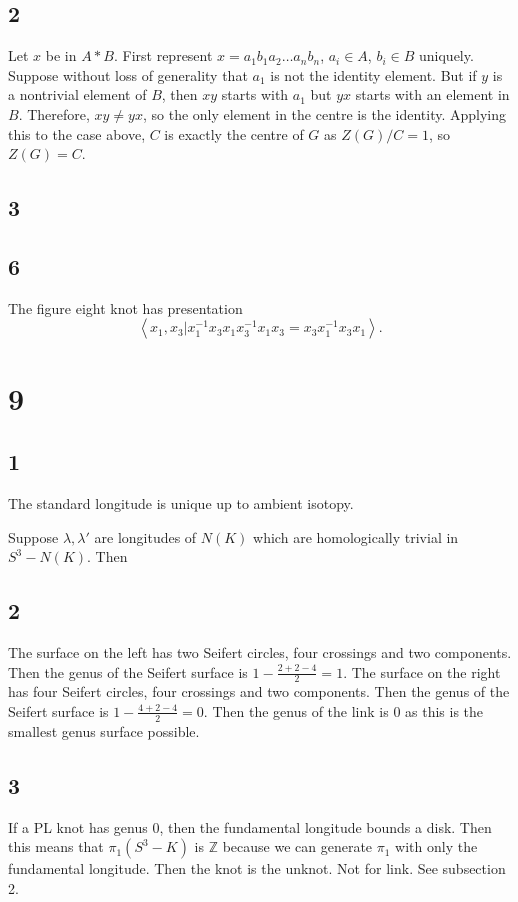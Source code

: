 \documentclass{article}
\theoremstyle{definition}
\numberwithin{theorem}{section}
\numberwithin{equation}{section}
\begin{document}
\subsection{2}
Let $x$ be in $A * B$. First represent $x = a_1 b_1 a_2 \ldots a_n b_n$, $a_i \in A$, $b_i \in B$ uniquely. Suppose without loss of generality that $a_1$ is not the identity element. But if $y$ is a nontrivial element of $B$, then $xy$ starts with $a_1$ but $yx$ starts with an element in $B$. Therefore, $xy \neq yx$, so the only element in the centre is the identity. Applying this to the case above, $C$ is exactly the centre of $G$ as $Z(G)/C = 1$, so $Z(G) = C$. 

\subsection{3}


\subsection{6}
The figure eight knot has presentation 
\begin{equation*}
    \left\langle
        x_1, x_3 | x_1^{-1} x_3 x_1 x_3^{-1} x_1 x_3 = x_3 x_1^{-1} x_3 x_1
    \right\rangle.
\end{equation*}

\section{9}
\subsection{1}
The standard longitude is unique up to ambient isotopy. 

Suppose $\lambda, \lambda'$ are longitudes of $N(K)$ which are homologically trivial in $S^3 - N(K)$. Then 

\subsection{2}
The surface on the left has two Seifert circles, four crossings and two components. Then the genus of the Seifert surface is $1 - \frac{2 + 2 - 4}{2} = 1$. The surface on the right has four Seifert circles, four crossings and two components. Then the genus of the Seifert surface is $1 - \frac{4 + 2 - 4}{2} = 0$. Then the genus of the link is 0 as this is the smallest genus surface possible. 

\subsection{3}
If a PL knot has genus 0, then the fundamental longitude bounds a disk. Then this means that $\pi_1(S^3 - K)$ is $\mathbb{Z}$ because we can generate $\pi_1$ with only the fundamental longitude. Then the knot is the unknot. Not for link. See subsection 2.
\end{document}
